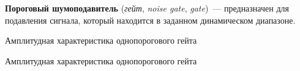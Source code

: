 \documentclass{beamer}
\begin{document}
\begin{frame}
  \textbf{Пороговый шумоподавитель} (\emph{гейт}, \emph{noise gate}, \emph{gate})~--- предназначен для подавления сигнала, который находится в заданном динамическом диапазоне.

  \begin{block}{Амплитудная характеристика однопорогового гейта}
  \end{block}
\end{frame}

\begin{frame}
  \begin{block}{Амплитудная характеристика однопорогового гейта}
  \end{block}
\end{frame}
\end{document}
